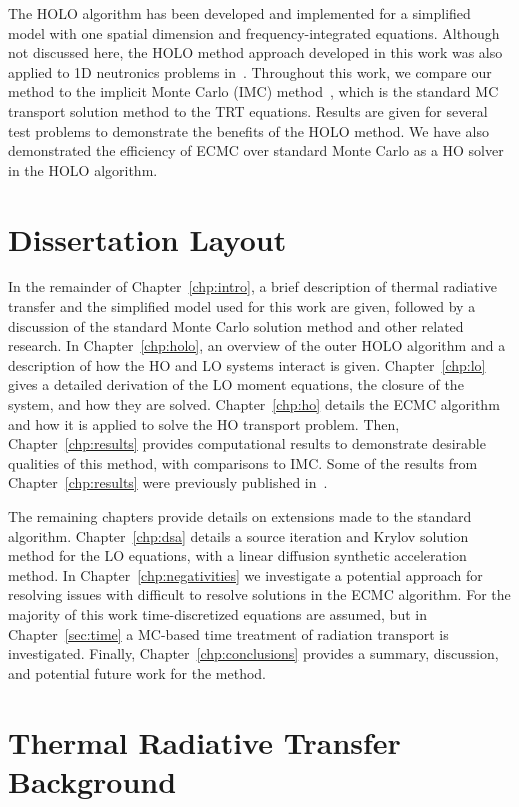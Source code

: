 The HOLO algorithm has been
developed and implemented for a simplified model with one spatial dimension and
frequency-integrated equations. 
Although not discussed here, the HOLO method approach
developed in this work was also applied to 1D neutronics problems in~\cite{ans_2014}.
Throughout this work, we compare our
method to the implicit Monte Carlo (IMC) method~\cite{fnc}, which is the standard MC
transport solution method to the TRT equations.  Results are given for several test
problems to demonstrate the benefits of the HOLO method.  We have also demonstrated the efficiency of ECMC over standard Monte Carlo
as a HO solver in the HOLO algorithm.  

\section{Dissertation Layout}


In the remainder of Chapter~\ref{chp:intro},  a brief description of thermal radiative transfer and the simplified model used
 for this work are given, followed by a discussion of the standard Monte Carlo
solution method and other related research.  
In Chapter~\ref{chp:holo}, an overview of the outer HOLO algorithm and a description of
how the HO and LO systems interact is given.
Chapter~\ref{chp:lo} gives a detailed derivation of the LO moment
equations, the closure of the system, and how they are solved. 
Chapter~\ref{chp:ho} details the ECMC algorithm and how it is applied to solve the HO transport problem.
Then, Chapter~\ref{chp:results} provides computational results to demonstrate desirable
qualities of this method, with comparisons to IMC.  Some of the results from
Chapter~\ref{chp:results} were previously published
in~\cite{bolding_nse}.

The remaining chapters provide details on extensions made to the standard algorithm.
Chapter~\ref{chp:dsa} details a source iteration and Krylov solution method for the LO
equations, with a linear diffusion synthetic acceleration method.  In
Chapter~\ref{chp:negativities} we investigate a potential approach for resolving issues
with difficult to resolve solutions in the ECMC algorithm.
For the majority of this work time-discretized equations are assumed, but in
Chapter~\ref{sec:time} a MC-based time treatment of radiation transport is investigated.
Finally, Chapter~\ref{chp:conclusions} provides a summary, discussion, and potential future work for the method.

\section{Thermal Radiative Transfer Background}

